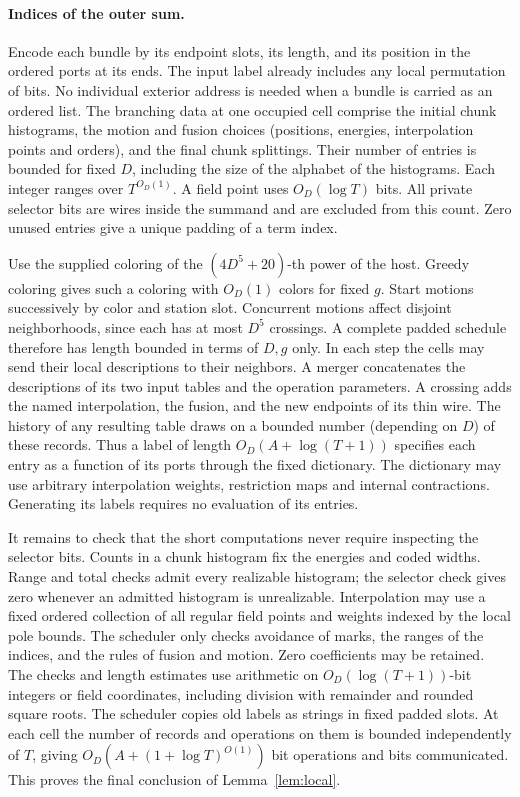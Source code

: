 \paragraph{Indices of the outer sum.}
Encode each bundle by its endpoint slots, its length, and its position
in the ordered ports at its ends. The input label already includes any local permutation of bits. No individual exterior address is
needed when a bundle is carried as an ordered list. The branching data
at one occupied cell comprise the initial chunk histograms, the motion
and fusion choices (positions, energies, interpolation points and
orders), and the final chunk splittings. Their number of entries is
bounded for fixed \(D\), including the size of the alphabet of the
histograms. Each integer ranges over \(T^{O_D(1)}\). A field point
uses \(O_D(\log T)\) bits. All private selector bits are wires inside
the summand and are excluded from this count. Zero unused entries
give a unique padding of a term index.

Use the supplied coloring of the \((4D^5+20)\)-th power of the host.
Greedy coloring gives such a coloring with \(O_D(1)\) colors for
fixed \(g\). Start motions successively by color and station slot. Concurrent motions affect disjoint neighborhoods,
since each has at most \(D^5\) crossings. A complete padded schedule
therefore has length bounded in terms of \(D,g\) only. In each step
the cells may send their local descriptions to their neighbors. A
merger concatenates the descriptions of its two input tables and the
operation parameters. A crossing adds the named interpolation, the
fusion, and the new endpoints of its thin wire. The history of any
resulting table draws on a bounded number (depending on \(D\)) of
these records. Thus a label of length \(O_D(A+\log(T+1))\) specifies
each entry as a function of its ports through the fixed dictionary.
The dictionary may use arbitrary interpolation weights, restriction maps
and internal contractions. Generating its labels requires no
evaluation of its entries.

It remains to check that the short computations never require inspecting
the selector bits. Counts in a chunk histogram fix the energies and
coded widths. Range and total checks admit every realizable histogram;
the selector check gives zero whenever an admitted histogram is
unrealizable. Interpolation may use a fixed ordered collection of all
regular field points and weights indexed by the local pole bounds.
The scheduler only checks avoidance of marks, the ranges of the indices,
and the rules of fusion and motion. Zero coefficients may be retained.
The checks and length estimates use arithmetic on
\(O_D(\log(T+1))\)-bit integers or field coordinates, including division
with remainder and rounded square roots. The scheduler copies old labels
as strings in fixed padded slots. At each cell the number of records and
operations on them is bounded independently of \(T\), giving
\(O_D(A+(1+\log T)^{O(1)})\) bit operations and bits communicated.
This proves the final conclusion of Lemma~\ref{lem:local}.
